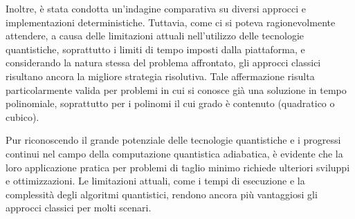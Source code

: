 \documentclass{article}
\begin{document}
Inoltre, è stata condotta un'indagine comparativa su diversi approcci e implementazioni deterministiche. Tuttavia, come ci si poteva ragionevolmente attendere, a causa delle limitazioni attuali nell'utilizzo delle tecnologie quantistiche, soprattutto i limiti di tempo imposti dalla piattaforma, e considerando la natura stessa del problema affrontato, gli approcci classici risultano ancora la migliore strategia risolutiva. Tale affermazione risulta particolarmente valida per problemi in cui si conosce già una soluzione in tempo polinomiale, soprattutto per i polinomi il cui grado è contenuto (quadratico o cubico).

Pur riconoscendo il grande potenziale delle tecnologie quantistiche e i progressi continui nel campo della computazione quantistica adiabatica, è evidente che la loro applicazione pratica per problemi di taglio minimo richiede ulteriori sviluppi e ottimizzazioni. Le limitazioni attuali, come i tempi di esecuzione e la complessità degli algoritmi quantistici, rendono ancora più vantaggiosi gli approcci classici per molti scenari.



\end{document}
